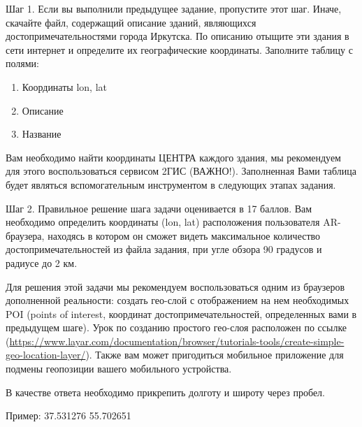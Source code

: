 
Шаг 1. Если вы выполнили предыдущее задание, пропустите этот шаг. Иначе, скачайте файл, содержащий описание зданий, являющихся достопримечательностями города Иркутска. По описанию отыщите эти здания в сети интернет и определите их географические координаты. Заполните таблицу с полями:

\begin{enumerate}
    \item Координаты lon, lat
    \item Описание
    \item Название
\end{enumerate}

Вам необходимо найти координаты ЦЕНТРА каждого здания, мы рекомендуем для этого воспользоваться сервисом 2ГИС (ВАЖНО!). Заполненная Вами таблица будет являться вспомогательным инструментом в следующих этапах задания.

Шаг 2. Правильное решение шага задачи оценивается в 17 баллов.  Вам необходимо определить координаты (lon, lat) расположения пользователя AR-браузера, находясь в котором он сможет видеть максимальное количество достопримечательностей из файла задания, при угле обзора 90 градусов и радиусе до 2 км.

Для решения этой задачи мы рекомендуем воспользоваться одним из браузеров дополненной реальности: создать гео-слой с отображением на нем необходимых POI (points of interest, координат достопримечательностей, определенных вами в предыдущем шаге). Урок по созданию простого гео-слоя 
расположен по ссылке (\url{https://www.layar.com/documentation/browser/tutorials-tools/create-simple-geo-location-layer/}). Также вам может пригодиться мобильное приложение для подмены геопозиции вашего мобильного устройства.

В качестве ответа необходимо прикрепить долготу и широту через пробел.

Пример:  37.531276 55.702651